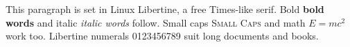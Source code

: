 \documentclass{article}
\begin{document}
This paragraph is set in Linux Libertine, a free Times-like serif.
Bold \textbf{bold words} and italic \textit{italic words} follow.
Small caps \textsc{Small Caps} and math $E = mc^2$ work too.
Libertine numerals 0123456789 suit long documents and books.
\end{document}

